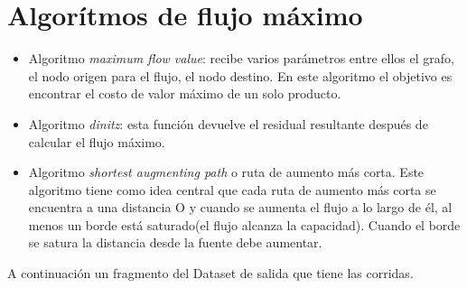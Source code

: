 \documentclass{article}
\begin{document}
\section{Algorítmos de flujo máximo}  

\begin{itemize}
  \item Algoritmo \textit{maximum flow value}: recibe varios parámetros entre ellos el grafo, el nodo origen para el flujo, el nodo destino. En este algoritmo el objetivo es encontrar el costo de valor máximo de un solo producto.   
  \item Algoritmo \textit{dinitz}: esta función devuelve el residual resultante después de calcular el flujo máximo.  
  \item Algoritmo \textit{shortest augmenting path} o ruta de aumento más corta. Este algoritmo tiene como idea central que cada ruta de aumento más corta se encuentra a una distancia O y cuando se aumenta el flujo a lo largo de él, al menos un borde está saturado(el flujo alcanza la capacidad). Cuando el borde se satura la distancia desde la fuente debe aumentar. 
   
\end{itemize}

A continuación un fragmento del Dataset de salida que tiene las corridas.
\end{document}
